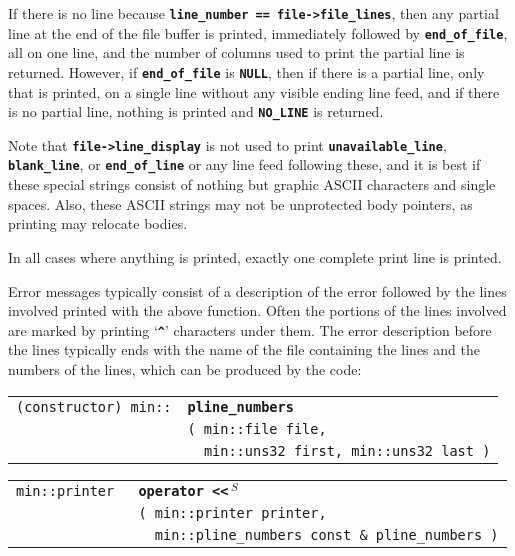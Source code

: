 \documentclass[12pt]{article}
\makeatletter
\newcommand{\TT}[1]{{\tt \bfseries #1}}
\newcommand{\ttindex}[1]{\index{#1@{\tt #1}}}
\newcommand{\ttomkey}[3]{\TT{operator #2}\index{#1@{\tt operator #2}!{#3}}}
\newcommand{\EOL}{\penalty \exhyphenpenalty}
\newenvironment{indpar}[1][0.3in]%
	{\begin{list}{}%
		     {\setlength{\itemsep}{0in}%
		      \setlength{\topsep}{0in}%
		      \setlength{\parsep}{1ex}%
		      \setlength{\labelwidth}{#1}%
		      \setlength{\leftmargin}{#1}%
		      \addtolength{\leftmargin}{\labelsep}}%
	 \item}%
	{\end{list}}
\newcommand{\LABEL}[1]{\label{#1}}
\newlength{\ARGBREAKLENGTH}
\newcommand{\ARGBREAK}[1][\ARGBREAKLENGTH]{\\&\hspace*{#1}}
\newcommand{\TTOMKEY}[3]{\ttomkey{#1}{#2}{#3}}
\newcommand{\MINKEY}[1]%
	   {\TT{#1}\ttindex{min::#1}\ttindex{#1}}
\newcommand{\RESIZE}{$\,^S$}
\makeatother
\begin{document}
If there is no line
because \TT{line\_\EOL number == file->\EOL file\_\EOL lines},
then any partial line at the end of the file buffer is printed,
immediately followed by \TT{end\_\EOL of\_\EOL file}, all on one line,
and the number of columns used to print the partial line is returned.
However, if \TT{end\_\EOL of\_\EOL file} is \TT{NULL}, then
if there is a partial line, only that is printed, on a single line
without any visible ending line feed, and if there is no partial line,
nothing is printed and \TT{NO\_\EOL LINE} is returned.

Note that
\TT{file->\EOL line\_\EOL display} is not used to print
\TT{unavailable\_\EOL line}, \TT{blank\_\EOL line}, or
\TT{end\_\EOL of\_\EOL line} or any line feed following these,
and it is best if these special strings consist of nothing but
graphic ASCII characters and single spaces.
Also, these ASCII strings may not be unprotected body pointers,
as printing may relocate bodies.

In all cases where anything is printed, exactly one complete print line is
printed.

Error messages typically consist of a description of the error
followed by the lines involved printed with the above function.
Often the portions of the lines involved are marked by printing
`\TT{\^{ }}' characters under them.  The error description before
the lines typically ends with the name of the file containing
the lines and the numbers of the lines, which can be produced
by the code:

\begin{indpar}[1em]\begin{tabular}{r@{}l}
\verb|(constructor) min::| & \MINKEY{pline\_numbers}\ARGBREAK
    \verb|( min::file file,|\ARGBREAK
    \verb|  min::uns32 first, min::uns32 last )|
\LABEL{MIN::PLINE_NUMBERS} \\
\end{tabular}\end{indpar}

\begin{indpar}[1em]\begin{tabular}{r@{}l}
\verb|min::printer |
    & \TTOMKEY{<<}{<{}<\RESIZE}%
              {of {\tt min::printer}}\ARGBREAK
      \verb|( min::printer printer,|\ARGBREAK
      \verb|  min::pline_numbers const & pline_numbers )|
\LABEL{PRINTER_OPERATOR<<_OF_PLINE_NUMBERS} \\
\end{tabular}\end{indpar}
\end{document}
